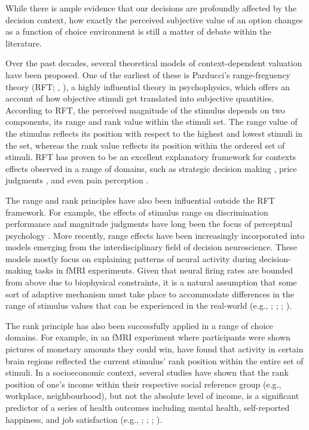 \documentclass[11pt,a4paper]{article}
\begin{document}
While there is ample evidence that our decisions are profoundly affected by the decision context, how exactly the perceived subjective value of an option changes as a function of choice environment is still a matter of debate within the literature. 

Over the past decades, several theoretical models of context-dependent valuation have been proposed. One of the earliest of these is Parducci's range-freguency theory (RFT; , ), a highly influential theory in psychophysics, which offers an account of how objective stimuli get translated into subjective quantities. According to RFT, the perceived magnitude of the stimulus depends on two components, its range and rank value within the stimuli set. The range value of the stimulus reflects its position with respect to the highest and lowest stimuli in the set, whereas the rank value reflects its position within the ordered set of stimuli. RFT has proven to be an excellent explanatory framework for contexts effects observed in a range of domains, such as strategic decision making \cite{Vlaev2006a}, price judgments \cite{Niedrich2009}, and even pain perception \cite{Watkinson2013}.  


The range and rank principles have also been influential outside the RFT framework. For example, the effects of stimulus range on discrimination performance and magnitude judgments have long been the focus of perceptual psychology \cite{Lockhead1986}. More recently, range effects have been increasingly incorporated into models emerging from the interdisciplinary field of decision neuroscience. These models mostly focus on explaining patterns of neural activity during decision-making tasks in fMRI experiments. Given that neural firing rates are bounded from above due to biophysical constraints, it is a natural assumption that some sort of adaptive mechanism must take place to accommodate differences in the range of stimulus values that can be experienced in the real-world (e.g., ; ; ; ).


The rank principle has also been successfully applied in a range of choice domains. For example, in an fMRI experiment where participants were shown pictures of monetary amounts they could win,  have found that activity in certain brain regions reflected the current stimulus' rank position within the entire set of stimuli. In a socioeconomic context, several studies have shown that the rank position of one's income within their respective social reference group (e.g., workplace, neighbourhood), but not the absolute level of income, is a significant predictor of a series of health outcomes including mental health, self-reported happiness, and job satisfaction (e.g., ; ; ; ).
\end{document}
